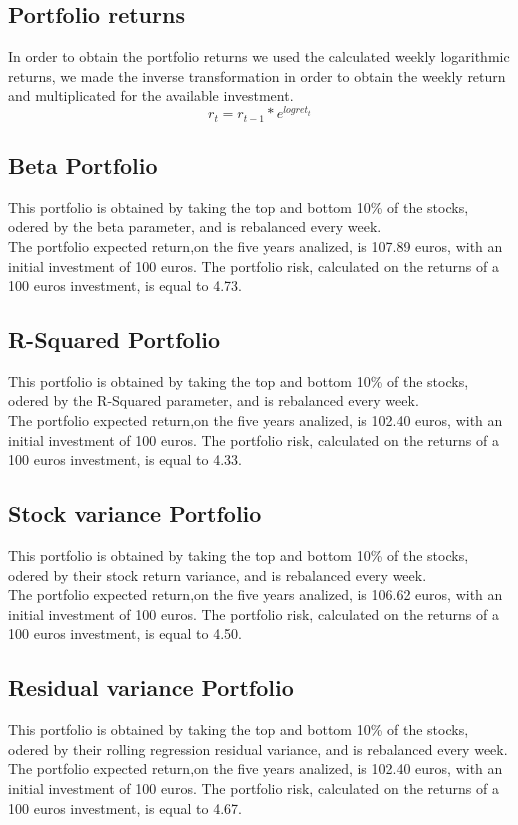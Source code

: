 \documentclass[12pt, a4paper, twocolumn]{article} %
\begin{document}
	\subsection{Portfolio returns}
	In order to obtain the portfolio returns we used the calculated weekly logarithmic returns, we made the inverse transformation in order to obtain the weekly return and multiplicated for the available investment.
	\[
	r_{t}	= r_{t-1}*e^{logret_{t}}
	\]
	\subsection{Beta Portfolio}
	This portfolio is obtained by taking the top and bottom 10\% of the stocks, odered by the beta parameter, and is rebalanced every week.\\
	The portfolio expected return,on the five years analized, is 107.89 euros, with an initial investment of 100 euros. The portfolio risk, calculated on the returns of a 100 euros investment, is equal to 4.73.
	\subsection{R-Squared Portfolio}
	This portfolio is obtained by taking the top and bottom 10\% of the stocks, odered by the R-Squared parameter, and is rebalanced every week.\\
	The portfolio expected return,on the five years analized, is 102.40 euros, with an initial investment of 100 euros. The portfolio risk, calculated on the returns of a 100 euros investment, is equal to 4.33.
	\subsection{Stock variance Portfolio}
	This portfolio is obtained by taking the top and bottom 10\% of the stocks, odered by their stock return variance, and is rebalanced every week.\\
	The portfolio expected return,on the five years analized, is 106.62 euros, with an initial investment of 100 euros. The portfolio risk, calculated on the returns of a 100 euros investment, is equal to 4.50.
	\subsection{Residual variance Portfolio}
	This portfolio is obtained by taking the top and bottom 10\% of the stocks, odered by their rolling regression residual variance, and is rebalanced every week.\\
	The portfolio expected return,on the five years analized, is 102.40 euros, with an initial investment of 100 euros. The portfolio risk, calculated on the returns of a 100 euros investment, is equal to 4.67.
\end{document}
